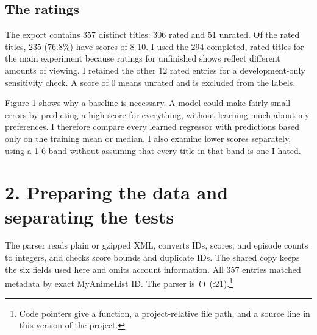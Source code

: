 \documentclass[10pt,a4paper]{article}
\newcommand{\codeptr}[3]{\texttt{\detokenize{#2}()} (\path{#1}:#3)}
\begin{document}
\subsection*{The ratings}
The export contains 357 distinct titles: 306 rated and 51 unrated. Of the rated titles, 235 (76.8\%) have scores of 8-10. I used the 294 completed, rated titles for the main experiment because ratings for unfinished shows reflect different amounts of viewing. I retained the other 12 rated entries for a development-only sensitivity check. A score of 0 means unrated and is excluded from the labels.
\begin{figure}[H]\centering
\begin{minipage}[t]{1\linewidth}\centering
{}
\end{minipage}\par\vspace{.3em}{\footnotesize Figure 1. Completed, rated titles (n=294): mean 8.19, median 9, and 95 favorites rated 10.}\end{figure}
Figure 1 shows why a baseline is necessary. A model could make fairly small errors by predicting a high score for everything, without learning much about my preferences. I therefore compare every learned regressor with predictions based only on the training mean or median. I also examine lower scores separately, using a 1-6 band without assuming that every title in that band is one I hated.

\clearpage

\section*{2. Preparing the data and separating the tests}
The parser reads plain or gzipped XML, converts IDs, scores, and episode counts to integers, and checks score bounds and duplicate IDs. The shared copy keeps the six fields used here and omits account information. All 357 entries matched metadata by exact MyAnimeList ID. The parser is \codeptr{src/ingest.py}{parse_export}{21}.\footnote{Code pointers give a function, a project-relative file path, and a source line in this version of the project.}
\end{document}
